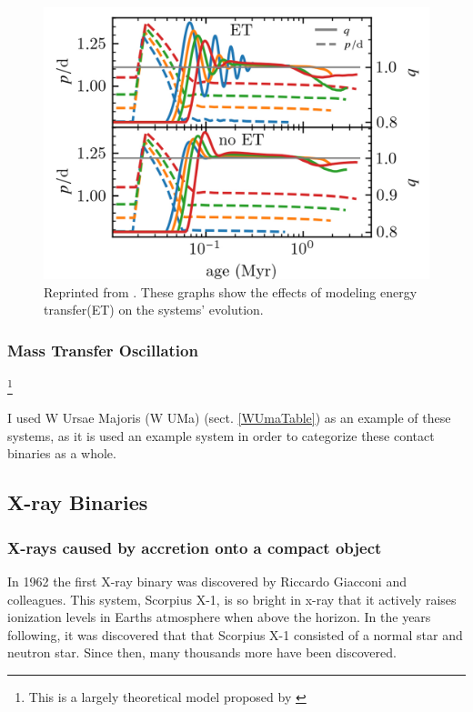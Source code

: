 \documentclass[12pt, a4paper]{article}
\begin{document}
        \begin{figure}[H]
            \centering
            \includegraphics[scale = .3]{figs/reused-figs/q-ratio_evolution_farby.png}
            \caption{Reprinted from \parencite{Fabry_2025}. These graphs show the effects of modeling energy transfer(ET) on the systems' evolution.}
            \label{qEvolution}
        \end{figure}

        \subsubsection{Mass Transfer Oscillation} \label{MassTransferOscillation} \footnote{This is a largely theoretical model proposed by \parencite{Fabry_2025}}
        
        I used W Ursae Majoris (W UMa) (sect. \ref{WUmaTable}) as an example of these systems, as it is used an example system in order to categorize these contact binaries as a whole.
    \subsection{X-ray Binaries} 
        \subsubsection{X-rays caused by accretion onto a compact object} \label{XrayAccretion}
            In 1962 the first X-ray binary was discovered by Riccardo Giacconi and colleagues. This system, Scorpius X-1, is so bright in x-ray that it actively raises ionization levels in Earths atmosphere when above the horizon. \parencite{TaurisvandenHeuvel+2023} \parencite{Giacconi_1962} In the years following, it was discovered that that Scorpius X-1 consisted of a normal star and neutron star. Since then, many thousands more have been discovered\parencite{Haardt_1993}.
\end{document}
